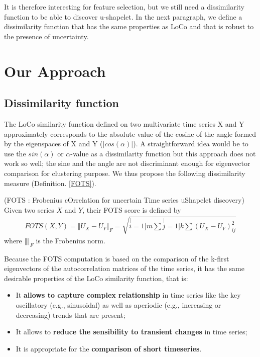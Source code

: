 It is therefore interesting for feature selection, but we still need a dissimilarity
function to be able to discover u-shapelet. In the next paragraph, we 
define a dissimilarity function that has the same properties as LoCo and that is
robust to the presence of uncertainty.
\section{Our Approach}
\subsection{Dissimilarity function}

The LoCo similarity function defined on two multivariate time series X and Y approximately corresponds  to the absolute value of the cosine of the angle formed by the eigenspaces of X and Y ($|cos(\alpha)|$). A straightforward idea would be to use the $sin(\alpha)$ or $\alpha$-value as a dissimilarity function but this approach does not work so well; the sine and the angle are not discriminant enough for eigenvector comparison for clustering purpose. We thus propose the following dissimilarity measure (Definition. \ref{FOTS}). 


\begin{definition}
\label{FOTS}
(FOTS : Frobenius cOrrelation for uncertain Time series uShapelet discovery) Given two series $X$
and $Y$, their FOTS score is defined by
\begin{eqnarray}
FOTS(X,Y)=\Vert U_{X}-U_{Y}\Vert_{F}
=\sqrt{\stackrel[i=1]{m}{\sum}\stackrel[j=1]{k}{\sum}(U_{X}-U_{Y})_{ij}^{2}}
\end{eqnarray}
where $\Vert\Vert_{F}$ is the Frobenius norm.
\end{definition}
 
 Because the FOTS computation is based on the comparison of the k-first eigenvectors of the autocorrelation
 matrices of the time series, it has the same desirable properties of the LoCo
 similarity function, that is: 
 
 \begin{itemize}
   \item It \textbf{allows to capture complex relationship}
in time series like the key oscillatory (e.g., sinusoidal) as well as aperiodic (e.g.,
increasing or decreasing) trends that are present;
   \item It allows to \textbf{reduce the sensibility to transient changes} in time
   series;
   \item It is appropriate for the \textbf{comparison of short
   timeseries}.
 \end{itemize}

